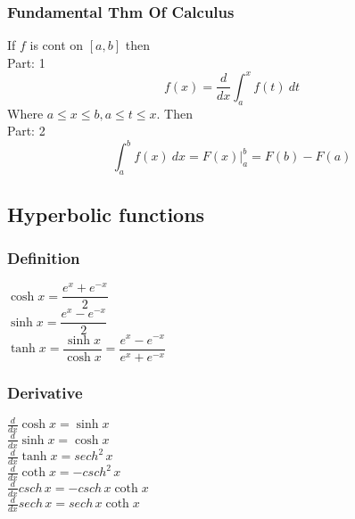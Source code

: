\documentclass[5pt]{article}
\begin{document}
\begin{multicols}{3}
\subsubsection{Fundamental Thm Of Calculus}
If $f$ is cont on $[a,b]$ then\\
Part: 1\\
\begin{equation}
    f(x)=\dfrac{d}{dx}\int^x_af(t)\: dt
\end{equation}
Where $a\leq x\leq b, a\leq t\leq x$. Then\\
Part: 2\\
\begin{equation}
\int^b_af(x)\:dx=F(x)\bigg|_a^b=F(b)-F(a)
\end{equation}

\subsection{Hyperbolic functions}
\subsubsection{Definition}
$\cosh{x} = \dfrac{e^x + e^{-x}}{2}$\\
$\sinh{x} = \dfrac{e^x - e^{-x}}{2}$\\
$\tanh{x} = \dfrac{\sinh{x}}{\cosh{x}} = \dfrac{e^x - e^{-x}}{e^x + e^{-x}} $\\
\subsubsection{Derivative}
$\frac{d}{dx}\cosh{x}=\sinh{x}$\\
$\frac{d}{dx}\sinh{x}=\cosh{x}$\\
$\frac{d}{dx}\tanh{x}=sech^2\,x$\\
$\frac{d}{dx}\coth{x}=-csch^2\,x$\\
$\frac{d}{dx}csch\,x=-csch\,x\coth{x}$\\
$\frac{d}{dx}sech\,x=sech\,x\coth{x}$\\

\end{multicols}
\end{document}

